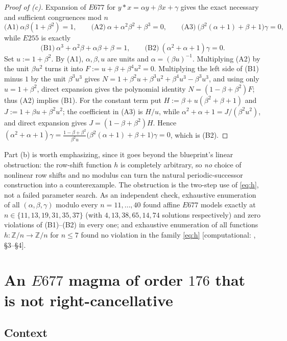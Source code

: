 \documentclass[11pt]{article}
\theoremstyle{plain}
\theoremstyle{definition}
\theoremstyle{remark}
\numberwithin{equation}{section}
\newcommand{\Z}{\mathbb{Z}}
\newcommand{\op}{\mathbin{*}}
\newcommand{\statusbox}[1]{{\small\sloppy\textsf{[#1]}}}
\newcommand{\COMP}[1]{\statusbox{computational: #1}}
\begin{document}
\begin{proof}[Proof of (c)]
Expansion of $E677$ for $y\op x = \alpha y+\beta x+\gamma$ gives the exact necessary and
sufficient congruences mod $n$
\[
  \text{(A1)}\ \alpha\beta(1+\beta^2)=1, \qquad
  \text{(A2)}\ \alpha+\alpha^2\beta^2+\beta^3=0, \qquad
  \text{(A3)}\ \bigl(\beta^2(\alpha+1)+\beta+1\bigr)\gamma=0,
\]
while $E255$ is exactly
\[
  \text{(B1)}\ \alpha^3+\alpha^2\beta+\alpha\beta+\beta=1, \qquad
  \text{(B2)}\ (\alpha^2+\alpha+1)\gamma = 0 .
\]
Set $u := 1+\beta^2$. By (A1), $\alpha,\beta,u$ are units and $\alpha = (\beta u)^{-1}$.
Multiplying (A2) by the unit $\beta u^2$ turns it into $F := u+\beta+\beta^4u^2 = 0$.
Multiplying the left side of (B1) minus $1$ by the unit $\beta^3u^3$ gives
$N = 1+\beta^2u+\beta^3u^2+\beta^4u^3-\beta^3u^3$, and using only $u = 1+\beta^2$, direct
expansion gives the polynomial identity $N = (1-\beta+\beta^2)F$; thus (A2) implies (B1).
For the constant term put $H := \beta+u(\beta^2+\beta+1)$ and $J := 1+\beta u+\beta^2u^2$;
the coefficient in (A3) is $H/u$, while $\alpha^2+\alpha+1 = J/(\beta^2u^2)$, and direct
expansion gives $J = (1-\beta+\beta^2)H$. Hence
$(\alpha^2+\alpha+1)\gamma = \frac{1-\beta+\beta^2}{\beta^2u}\bigl(\beta^2(\alpha+1)+\beta+1\bigr)\gamma = 0$,
which is (B2).
\end{proof}

Part (b) is worth emphasizing, since it goes beyond the blueprint's linear obstruction: the
row-shift function $h$ is completely arbitrary, so \emph{no} choice of nonlinear row shifts
and no modulus can turn the natural periodic-successor construction into a counterexample.
The obstruction is the two-step use of \eqref{eq:h}, not a failed parameter search. As an
independent check, exhaustive enumeration of all $(\alpha,\beta,\gamma)$ modulo every
$n = 11,\dots,40$ found affine $E677$ models exactly at
$n\in\{11,13,19,31,35,37\}$ (with $4,13,38,65,14,74$ solutions respectively) and zero
violations of (B1)--(B2) in every one; and exhaustive enumeration of all functions
$h : \Z/n\to\Z/n$ for $n\le 7$ found no violation in the family \eqref{eq:h}
\COMP{\cite{F4}, \S3--\S4}.

\section{An $E677$ magma of order $176$ that is not right-cancellative}\label{sec:176}

\subsection{Context}
\end{document}
